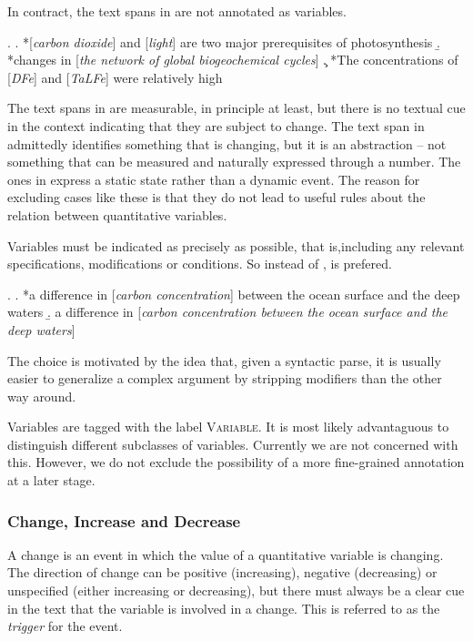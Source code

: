\documentclass[10pt, a4paper]{article}
\newcommand{\tag}[1]{\textsc{#1}}
\begin{document}
In contract, the text spans in \Next are not annotated as variables.

\ex.
  \a. *[\emph{carbon dioxide}] and [\emph{light}] are two major prerequisites of photosynthesis
  \b. *changes in [\emph{the network of global biogeochemical cycles}] 
  \c. *The concentrations of [\emph{DFe}] and [\emph{TaLFe}] were relatively high

The text spans in \Last[a] are measurable, in principle at least, but there is no textual cue in the context indicating that they are subject to change. 
The text span in \Last[b] admittedly identifies something that is changing, but it is an abstraction -- not something that can be measured and naturally expressed through a number. 
The ones in \Last[c] express a static state rather than a dynamic event.
The reason for excluding cases like these is that they do not lead to useful rules about the relation between quantitative variables.

Variables must be indicated as precisely as possible, that is,including any relevant specifications, modifications or conditions. So instead of \Next[a], \Next[b] is prefered.

\ex.
  \a. *a difference in [\emph{carbon concentration}] between the ocean surface and the deep waters
  \b. a difference in [\emph{carbon concentration between the ocean surface and the deep waters}]

The choice is motivated by the idea that, given a syntactic parse, it is usually easier to generalize a complex argument by stripping modifiers than the other way around.  

Variables are tagged with the label \tag{Variable}. It is most likely advantaguous to distinguish different subclasses of variables. Currently we are not concerned with this. 
However, we do not exclude the possibility of a more fine-grained annotation at a later stage. 


\subsubsection{Change, Increase and Decrease}

A change is an event in which the value of a quantitative variable is changing.
The direction of change can be positive (increasing), negative (decreasing) or unspecified (either increasing or decreasing), but there must always be a clear cue in the text that the variable is involved in a change.
This is referred to as the \emph{trigger} for the event.
\end{document}
